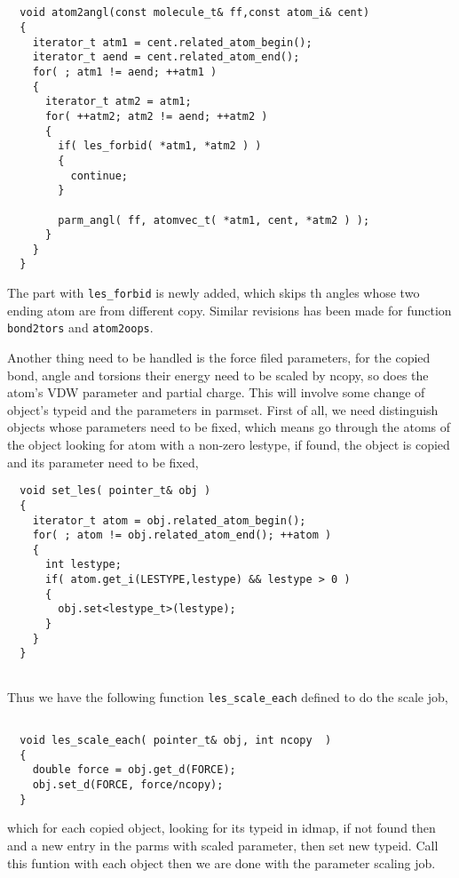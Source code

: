 \documentclass[letterpaper]{book}
\begin{document}
\begin{lstlisting}


  void atom2angl(const molecule_t& ff,const atom_i& cent)
  {
    iterator_t atm1 = cent.related_atom_begin();
    iterator_t aend = cent.related_atom_end();
    for( ; atm1 != aend; ++atm1 )
    {
      iterator_t atm2 = atm1;
      for( ++atm2; atm2 != aend; ++atm2 )
      {
        if( les_forbid( *atm1, *atm2 ) )
        {
          continue;
        }
        
        parm_angl( ff, atomvec_t( *atm1, cent, *atm2 ) );
      }
    }
  }

\end{lstlisting}

The part with \lstinline$les_forbid$ is newly added, which skips th angles whose two ending atom are from 
different copy. Similar revisions has been made for function \lstinline$bond2tors$ and \lstinline$atom2oops$.


Another thing need to be handled is the force filed parameters, for the copied bond, angle and 
torsions their energy need to be scaled by ncopy, so does the atom's VDW parameter and partial 
charge. This will involve some change of object's typeid and the parameters in parmset. First
of all, we need distinguish objects whose parameters need to be fixed, which means go through 
the atoms of the object looking for atom with a non-zero lestype, if found, the object is copied
and its parameter need to be fixed,

\begin{lstlisting}
  void set_les( pointer_t& obj )
  {
    iterator_t atom = obj.related_atom_begin();
    for( ; atom != obj.related_atom_end(); ++atom )
    {
      int lestype;
      if( atom.get_i(LESTYPE,lestype) && lestype > 0 )
      {
        obj.set<lestype_t>(lestype);
      }
    }
  }
  
\end{lstlisting}

Thus we have the following function \lstinline$les_scale_each$ defined to do the scale job,

\begin{lstlisting}    

  void les_scale_each( pointer_t& obj, int ncopy  ) 
  {
    double force = obj.get_d(FORCE);
    obj.set_d(FORCE, force/ncopy);
  }

\end{lstlisting}

which for each copied object, looking for its typeid in idmap, if not found then and a new entry
 in the parms with scaled parameter, then set new typeid. Call this funtion with each object 
then we are done with the parameter scaling job.
\end{document}
